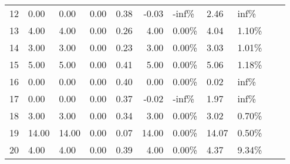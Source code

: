 \begin{frame}
\begin{tabular}{lllrrrlllll}
    12 & 0.00                 & 0.00                   & 0.00                    & 0.38 & -0.03                  & -inf\% & 2.46  & inf\%    \\
    13 & 4.00                 & 4.00                   & 0.00                    & 0.26 & 4.00                   & 0.00\% & 4.04  & 1.10\%   \\
    14 & 3.00                 & 3.00                   & 0.00                    & 0.23 & 3.00                   & 0.00\% & 3.03  & 1.01\%   \\
    15 & 5.00                 & 5.00                   & 0.00                    & 0.41 & 5.00                   & 0.00\% & 5.06  & 1.18\%   \\
    16 & 0.00                 & 0.00                   & 0.00                    & 0.40 & 0.00                   & 0.00\% & 0.02  & inf\%    \\
    17 & 0.00                 & 0.00                   & 0.00                    & 0.37 & -0.02                  & -inf\% & 1.97  & inf\%    \\
    18 & 3.00                 & 3.00                   & 0.00                    & 0.34 & 3.00                   & 0.00\% & 3.02  & 0.70\%   \\
    19 & 14.00                & 14.00                  & 0.00                    & 0.07 & 14.00                  & 0.00\% & 14.07 & 0.50\%   \\
    20 & 4.00                 & 4.00                   & 0.00                    & 0.39 & 4.00                   & 0.00\% & 4.37  & 9.34\%   \\
  \end{tabular}
  \normalsize
\end{frame}

